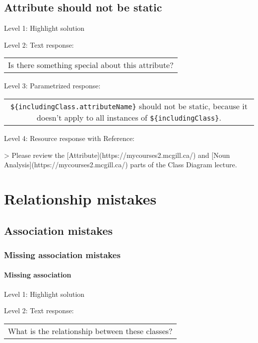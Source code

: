 \subsection{Attribute should not be static}

\noindent Level 1: Highlight solution \medskip

\noindent Level 2: Text response: \medskip

\begin{tabular}{|c}
Is there something special about this attribute?
\end{tabular} \medskip

\noindent Level 3: Parametrized response: \medskip

\begin{tabular}{|c}
\verb|${includingClass.attributeName}| should not be static, because it doesn't apply to all instances of \verb|${includingClass}|.
\end{tabular} \medskip

\noindent Level 4: Resource response with Reference:

> Please review the [Attribute](https://mycourses2.mcgill.ca/) and [Noun Analysis](https://mycourses2.mcgill.ca/) parts of the Class Diagram lecture.



\section{Relationship mistakes}

\subsection{Association mistakes}

\subsubsection{Missing association mistakes}

\paragraph{Missing association}

\noindent Level 1: Highlight solution \medskip

\noindent Level 2: Text response: \medskip

\begin{tabular}{|c}
What is the relationship between these classes?
\end{tabular} \medskip

